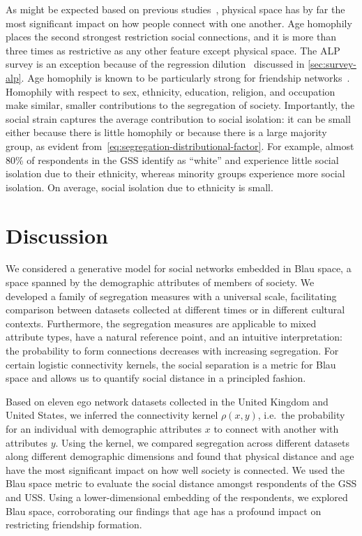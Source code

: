 \documentclass{scrartcl}
\begin{document}
As might be expected based on previous studies~\cite{Lambiotte2008, Expert2011, Backstrom2010, Scellato2011, Illenberger2013}, physical space has by far the most significant impact on how people connect with one another. Age homophily places the second strongest restriction social connections, and it is more than three times as restrictive as any other feature except physical space. The ALP survey is an exception because of the regression dilution~\cite{Hutcheon2010} discussed in \cref{sec:survey-alp}. Age homophily is known to be particularly strong for friendship networks~\cite{McPherson2001}. Homophily with respect to sex, ethnicity, education, religion, and occupation make similar, smaller contributions to the segregation of society. Importantly, the social strain captures the average contribution to social isolation: it can be small either because there is little homophily or because there is a large majority group, as evident from~\cref{eq:segregation-distributional-factor}. For example, almost 80\% of respondents in the GSS identify as ``white'' and experience little social isolation due to their ethnicity, whereas minority groups experience more social isolation. On average, social isolation due to ethnicity is small.

\section{Discussion\label{sec:discussion}}

We considered a generative model for social networks embedded in Blau space, a space spanned by the demographic attributes of members of society. We developed a family of segregation measures with a universal scale, facilitating comparison between datasets collected at different times or in different cultural contexts. Furthermore, the segregation measures are applicable to mixed attribute types, have a natural reference point, and an intuitive interpretation: the probability to form connections decreases with increasing segregation. For certain logistic connectivity kernels, the social separation is a metric for Blau space and allows us to quantify social distance in a principled fashion.

Based on eleven ego network datasets collected in the United Kingdom and United States, we inferred the connectivity kernel $\rho(x,y)$, i.e.\ the probability for an individual with demographic attributes $x$ to connect with another with attributes $y$. Using the kernel, we compared segregation across different datasets along different demographic dimensions and found that physical distance and age have the most significant impact on how well society is connected. We used the Blau space metric to evaluate the social distance amongst respondents of the GSS and USS. Using a lower-dimensional embedding of the respondents, we explored Blau space, corroborating our findings that age has a profound impact on restricting friendship formation.
\end{document}
